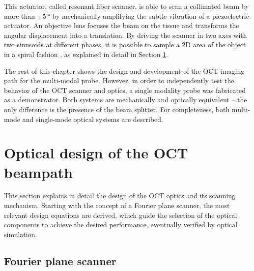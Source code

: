 This actuator, called resonant fiber scanner, is able to scan a collimated beam by more than $\pm \SI{5}{\degree}$ by mechanically amplifying the subtle vibration of a piezoelectric actuator.  An objective lens focuses the beam on the tissue and transforms the angular displacement into a translation. By driving the scanner in two axes with two sinusoids at different phases, it is possible to sample a 2D area of the object in a spiral fashion \cite{Seibel2006}, as explained in detail in Section \ref{sec:Optical}.

The rest of this chapter shows the design and development of the OCT imaging path for the multi-modal probe. However, in order to independently test the behavior of the OCT scanner and optics, a single modality probe was fabricated as a demonstrator. Both systems are mechanically and optically equivalent -- the only difference is the presence of the beam splitter. 
For completeness, both multi-mode and single-mode optical systems are described.


\section{Optical design of the OCT beampath}
\label{sec:Optical}
This section explains in detail the design of the OCT optics and its scanning mechanism. Starting with the concept of a Fourier plane scanner, the most relevant design equations are derived, which guide the selection of the optical components to achieve the desired performance, eventually verified by optical simulation. 

\subsection{Fourier plane scanner}



